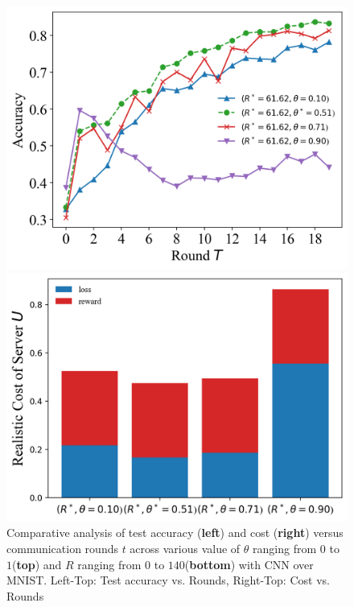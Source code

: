 \documentclass{article}
\theoremstyle{plain}
\theoremstyle{definition}
\theoremstyle{remark}
\begin{document}
\begin{figure}
\begin{minipage}{0.49\linewidth}
		\centerline{\includegraphics[width=\textwidth]{figures/figure_65_B.png}}
	\end{minipage}
	\begin{minipage}{0.49\linewidth}
		\centerline{\includegraphics[width=\textwidth]{figures/figure_66_B.png}}
	\end{minipage}
	\caption{Comparative analysis of test accuracy (\textbf{left}) and cost (\textbf{right}) versus communication rounds $t$ across various value of $\theta$ ranging from $0$ to $1$(\textbf{top}) and $R$ ranging from $0$ to $140$(\textbf{bottom}) with CNN over MNIST. Left-Top: Test accuracy vs. Rounds, Right-Top: Cost vs. Rounds}
  \label{fig:server_staleness}
\end{figure}
\end{document}

